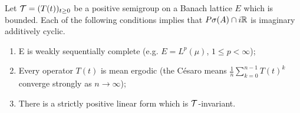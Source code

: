 \begin{corollary}\label{cor:c3-4.3}
	Let $\mathcal{T} = (T(t))_{t \geq 0}$ be a positive semigroup on a Banach lattice $E$ which is bounded. 
	Each of the following conditions implies that $P\sigma(A)\cap i\mathbb{R} $ is imaginary additively cyclic.
	\begin{enumerate}[\upshape (i)]
		\item E is weakly sequentially complete (e.g. $E = L^{p}(\mu)$, $1 \leq p < \infty$);
		\item Every operator $T(t)$ is mean ergodic (\ie the Césaro means $\frac{1}{n}\sum_{k=0}^{n-1}T(t)^{k}$ converge strongly as $n \to  \infty$);
		\item There is a strictly positive linear form which is $\mathcal{T}$-invariant.
	\end{enumerate}
\end{corollary}
%
